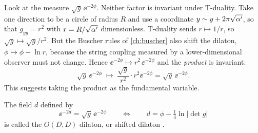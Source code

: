 Look at the measure $\sqrt g\,\ee^{-2\phi}$. Neither factor is invariant under T-duality. Take
one direction to be a circle of radius $R$ and use a coordinate $y\sim y+2\pi\sqrt{\alpha'}$, so
that $g_{yy}=r^2$ with $r=R/\sqrt{\alpha'}$ dimensionless. T-duality sends $r\mapsto1/r$, so
$\sqrt g\mapsto\sqrt g/r^2$. But the Buscher rules of \cref{ch:buscher} also shift the dilaton,
$\phi\mapsto\phi-\ln r$, because the string coupling measured by a lower-dimensional observer
must not change. Hence $\ee^{-2\phi}\mapsto r^2\,\ee^{-2\phi}$ and the \emph{product} is
invariant:
\begin{equation}\label{eq:dftaction:buscherinv}
\sqrt g\,\ee^{-2\phi}\;\longmapsto\;\frac{\sqrt g}{r^2}\cdot r^2\ee^{-2\phi}=\sqrt g\,\ee^{-2\phi}.
\end{equation}
This suggests taking the product as the fundamental variable.

\begin{definition}\label{def:dftaction:d}
The field $d$ defined by
\begin{equation}\label{eq:dftaction:d}
\ee^{-2d}=\sqrt g\,\ee^{-2\phi}\qquad\Longleftrightarrow\qquad d=\phi-\tfrac14\ln|\det g|
\end{equation}
is called the $O(D,D)$ dilaton, or shifted dilaton
.
\end{definition}

